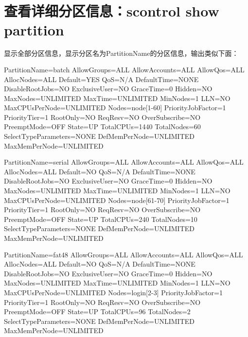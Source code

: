 \section{查看详细分区信息：scontrol show partition}
显示全部分区信息，显示分区名为PartitionName的分区信息，输出类似下面：
\begin{OUT}
PartitionName=batch
   AllowGroups=ALL AllowAccounts=ALL AllowQos=ALL
   AllocNodes=ALL Default=YES QoS=N/A
   DefaultTime=NONE DisableRootJobs=NO ExclusiveUser=NO GraceTime=0 Hidden=NO
   MaxNodes=UNLIMITED MaxTime=UNLIMITED MinNodes=1 LLN=NO MaxCPUsPerNode=UNLIMITED
   Nodes=node[1-60]
   PriorityJobFactor=1 PriorityTier=1 RootOnly=NO ReqResv=NO OverSubscribe=NO PreemptMode=OFF
   State=UP TotalCPUs=1440 TotalNodes=60 SelectTypeParameters=NONE
   DefMemPerNode=UNLIMITED MaxMemPerNode=UNLIMITED

PartitionName=serial
   AllowGroups=ALL AllowAccounts=ALL AllowQos=ALL
   AllocNodes=ALL Default=NO QoS=N/A
   DefaultTime=NONE DisableRootJobs=NO ExclusiveUser=NO GraceTime=0 Hidden=NO
   MaxNodes=UNLIMITED MaxTime=UNLIMITED MinNodes=1 LLN=NO MaxCPUsPerNode=UNLIMITED
   Nodes=node[61-70]
   PriorityJobFactor=1 PriorityTier=1 RootOnly=NO ReqResv=NO OverSubscribe=NO PreemptMode=OFF
   State=UP TotalCPUs=240 TotalNodes=10 SelectTypeParameters=NONE
   DefMemPerNode=UNLIMITED MaxMemPerNode=UNLIMITED

PartitionName=fat48
   AllowGroups=ALL AllowAccounts=ALL AllowQos=ALL
   AllocNodes=ALL Default=NO QoS=N/A
   DefaultTime=NONE DisableRootJobs=NO ExclusiveUser=NO GraceTime=0 Hidden=NO
   MaxNodes=UNLIMITED MaxTime=UNLIMITED MinNodes=1 LLN=NO MaxCPUsPerNode=UNLIMITED
   Nodes=login[2-3]
   PriorityJobFactor=1 PriorityTier=1 RootOnly=NO ReqResv=NO OverSubscribe=NO PreemptMode=OFF
   State=UP TotalCPUs=96 TotalNodes=2 SelectTypeParameters=NONE
   DefMemPerNode=UNLIMITED MaxMemPerNode=UNLIMITED
\end{OUT}

